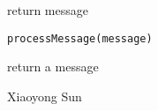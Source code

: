 \begin{Description}\relax
return message
\end{Description}
\begin{Usage}
\begin{verbatim}
processMessage(message)
\end{verbatim}
\end{Usage}
\begin{Arguments}
\begin{ldescription}
\item[\code{message}] 
\end{ldescription}
\end{Arguments}
\begin{Value}
return a message
\end{Value}
\begin{Author}\relax
Xiaoyong Sun
\end{Author}

